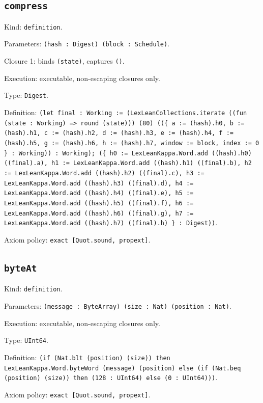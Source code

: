 \documentclass[11pt]{article}
\begin{document}
\subsection*{\texttt{compress}}
\noindent Kind: \texttt{definition}.\par
\noindent Parameters: \texttt{(hash : Digest) (block : Schedule)}.\par
\noindent Closure 1: binds \texttt{(state)}, captures \texttt{()}.\par
\noindent Execution: executable, non-escaping closures only.\par
\noindent Type: \texttt{Digest}.\par
\noindent Definition: \texttt{(let final : Working := (LexLeanCollections.iterate ((fun (state : Working) => round (state))) (80) ((\{ a := (hash).h0, b := (hash).h1, c := (hash).h2, d := (hash).h3, e := (hash).h4, f := (hash).h5, g := (hash).h6, h := (hash).h7, window := block, index := 0 \} : Working)) : Working); (\{ h0 := LexLeanKappa.Word.add ((hash).h0) ((final).a), h1 := LexLeanKappa.Word.add ((hash).h1) ((final).b), h2 := LexLeanKappa.Word.add ((hash).h2) ((final).c), h3 := LexLeanKappa.Word.add ((hash).h3) ((final).d), h4 := LexLeanKappa.Word.add ((hash).h4) ((final).e), h5 := LexLeanKappa.Word.add ((hash).h5) ((final).f), h6 := LexLeanKappa.Word.add ((hash).h6) ((final).g), h7 := LexLeanKappa.Word.add ((hash).h7) ((final).h) \} : Digest))}.\par
\noindent Axiom policy: \texttt{exact [Quot.sound, propext]}.\par
\subsection*{\texttt{byteAt}}
\noindent Kind: \texttt{definition}.\par
\noindent Parameters: \texttt{(message : ByteArray) (size : Nat) (position : Nat)}.\par
\noindent Execution: executable, non-escaping closures only.\par
\noindent Type: \texttt{UInt64}.\par
\noindent Definition: \texttt{(if (Nat.blt (position) (size)) then LexLeanKappa.Word.byteWord (message) (position) else (if (Nat.beq (position) (size)) then (128 : UInt64) else (0 : UInt64)))}.\par
\noindent Axiom policy: \texttt{exact [Quot.sound, propext]}.\par
\end{document}
